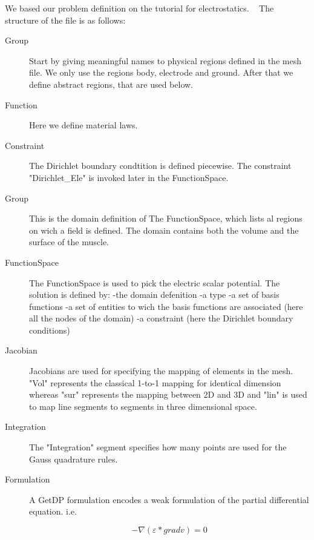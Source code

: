 \documentclass[preprint,journal]{vgtc}       %
\begin{document}
We based our problem definition on the tutorial for electrostatics. ~\cite{Geuzaine2009}
The structure of the file is as follows:

\begin{description}
	\item[Group]
	Start by giving meaningful names to physical regions defined in the mesh file.
	We only use the regions body, electrode and ground. 
	After that we define abstract regions, that are used below.
	\item[Function]
	Here we define material laws.
	\item[Constraint]
	The Dirichlet boundary condtition is defined piecewise. 
	The constraint "Dirichlet\_Ele" is invoked later in the FunctionSpace.
	\item[Group]
	This is the domain definition of The FunctionSpace, which lists al regions on wich a field is defined. 
	The domain contains both the volume and the surface of the muscle.
	\item[FunctionSpace]
	The FunctionSpace is used to pick the electric scalar potential. 
	The solution is defined  by:\newline
	-the domain defenition\newline
	-a type\newline
	-a set of basis functions\newline %
	-a set of entities to wich the basis functions are associated (here all the nodes of the domain)\newline
	-a constraint (here the Dirichlet boundary conditions)
	
	\item[Jacobian] %
	Jacobians are used for specifying the mapping of elements in the mesh.
	"Vol" represents the classical 1-to-1 mapping for identical dimension whereas "sur" represents the mapping between 2D and 3D and "lin" is used to map line segments to segments in three dimensional space.
	
	\item[Integration]
	The "Integration" segment specifies how many points are used for the Gauss quadrature rules. %
	
	\item[Formulation]
	A GetDP formulation encodes a weak formulation of the partial differential equation. i.e. 
	
	
	\[-\nabla (\varepsilon *\mathrel{grad} v) = 0\]
	

\end{description}
\end{document}
